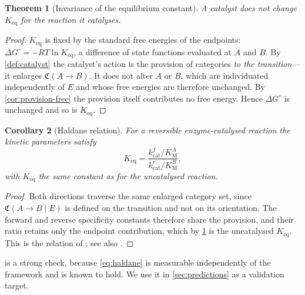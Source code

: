 \documentclass[11pt,twocolumn,a4paper]{article}
\theoremstyle{plain}
\newtheorem{theorem}{Theorem}[section]
\newtheorem{corollary}[theorem]{Corollary}
\theoremstyle{definition}
\theoremstyle{remark}
\newcommand{\Cat}{\mathfrak{C}}
\newcommand{\kcat}{k_{\mathrm{cat}}}
\newcommand{\KM}{K_{\mathrm{M}}}
\newcommand{\Keq}{K_{\mathrm{eq}}}
\newcommand{\Enz}{E}
\begin{document}
\begin{theorem}[Invariance of the equilibrium constant]
\label{thm:keq}
A catalyst does not change $\Keq$ for the reaction it catalyses.
\end{theorem}

\begin{proof}
$\Keq$ is fixed by the standard free energies of the endpoints:
$\Delta G^\circ = -RT\ln \Keq$, a difference of state functions evaluated at $A$
and $B$. By \cref{def:catalyst} the catalyst's action is the provision of
categories \emph{to the transition}---it enlarges $\Cat(A\to B)$. It does not
alter $A$ or $B$, which are individuated independently of $\Enz$ and whose free
energies are therefore unchanged. By \cref{cor:provision-free} the provision
itself contributes no free energy. Hence $\Delta G^\circ$ is unchanged and so is
$\Keq$.
\end{proof}

\begin{corollary}[Haldane relation]
\label{cor:haldane}
For a reversible enzyme-catalysed reaction the kinetic parameters satisfy
\begin{equation}
\Keq = \frac{\kcat^{f}/\KM^{A}}{\kcat^{r}/\KM^{B}} ,
\label{eq:haldane}
\end{equation}
with $\Keq$ the same constant as for the uncatalysed reaction.
\end{corollary}

\begin{proof}
Both directions traverse the same enlarged category set, since
$\Cat(A\to B\mid \Enz)$ is defined on the transition and not on its orientation.
The forward and reverse specificity constants therefore share the provision, and
their ratio retains only the endpoint contribution, which by \cref{thm:keq} is
the uncatalysed $\Keq$. This is the relation of \citet{haldane1930}; see also
\citet{alberty1953}.
\end{proof}

 is a strong check, because \cref{eq:haldane} is measurable
independently of the framework and is known to hold. We use it in
\cref{sec:predictions} as a validation target.
\end{document}
